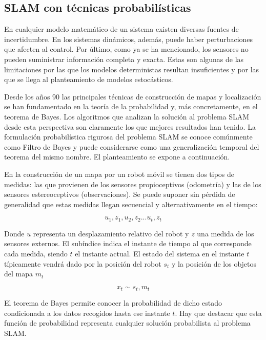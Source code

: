  \subsection{SLAM con técnicas probabilísticas}
En cualquier modelo matemático de un sistema existen diversas fuentes de incertidumbre. En los sistemas dinámicos, además, puede haber perturbaciones que afecten al control. Por último, como ya se ha mencionado, los sensores no pueden suministrar información completa y exacta. Estas son algunas de las limitaciones por las que los modelos deterministas resultan insuficientes y por las que se llega al planteamiento de modelos estocásticos.

Desde los años 90 las principales técnicas de construcción de mapas y localización se han fundamentado en la teoría de la probabilidad y, más concretamente, en el teorema de Bayes. Los algoritmos que analizan la solución al problema SLAM desde esta perspectiva son claramente los que mejores resultados han tenido.
La formulación probabilística rigurosa del problema SLAM se conoce comúnmente como Filtro de Bayes y puede considerarse como una generalización temporal del teorema del mismo nombre. El planteamiento se expone a conti\-nuación\cite{Rodriguez-Losada04}.

En la construcción de un mapa por un robot móvil se tienen dos tipos de medidas: las que provienen de los sensores propioceptivos (odometría) y las de los sensores estereoceptivos (observaciones). Se puede suponer sin pérdida de generalidad que estas medidas llegan secuencial y alternativamente en el tiempo:

\begin{equation}\label{eq:medidas-sensores}
    u_{1},z_{1},u_{2},z_{2}...u_{t},z_{t}
\end{equation}

Donde $u$ representa un desplazamiento relativo del robot y $z$ una medida de los sensores externos. El subíndice indica el instante de tiempo al que corresponde cada medida, siendo $t$ el instante actual.
El estado del sistema en el instante $t$ típicamente vendrá dado por la posición del robot $s_{t}$ y la posición de los objetos del mapa $m_{t}$

\begin{equation}\label{eq:estado}
    x_{t}\sim s_{t},m_{t}
\end{equation}

El teorema de Bayes permite conocer la probabilidad de dicho estado condicionada a los datos recogidos hasta ese instante $t$. Hay que destacar que esta función de probabilidad representa cualquier solución probabilista al problema SLAM.

